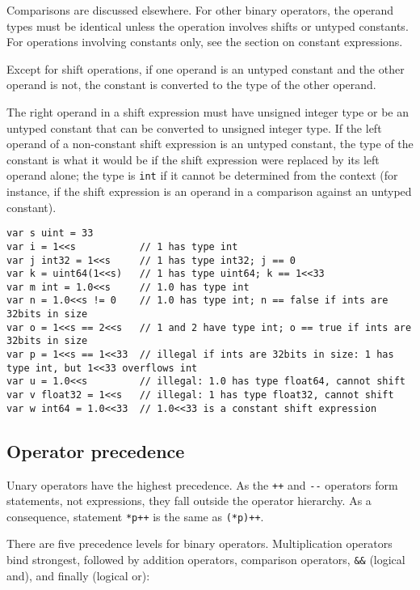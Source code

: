 Comparisons are discussed elsewhere.
For other binary operators, the operand types must be
identical unless the operation involves
shifts or untyped constants. For operations
involving constants only, see the section on
constant expressions.

Except for shift operations, if one operand is an untyped
constant and the other operand is not, the
constant is converted to the type of the other
operand.

The right operand in a shift expression must have unsigned integer type
or be an untyped constant that can be converted to unsigned integer
type. If the left operand of a non-constant shift expression is an
untyped constant, the type of the constant is what it would be if the
shift expression were replaced by its left operand alone; the type is
\texttt{int} if it cannot be determined from the context (for instance,
if the shift expression is an operand in a comparison against an untyped
constant).

\begin{Verbatim}[frame=single]
var s uint = 33
var i = 1<<s           // 1 has type int
var j int32 = 1<<s     // 1 has type int32; j == 0
var k = uint64(1<<s)   // 1 has type uint64; k == 1<<33
var m int = 1.0<<s     // 1.0 has type int
var n = 1.0<<s != 0    // 1.0 has type int; n == false if ints are 32bits in size
var o = 1<<s == 2<<s   // 1 and 2 have type int; o == true if ints are 32bits in size
var p = 1<<s == 1<<33  // illegal if ints are 32bits in size: 1 has type int, but 1<<33 overflows int
var u = 1.0<<s         // illegal: 1.0 has type float64, cannot shift
var v float32 = 1<<s   // illegal: 1 has type float32, cannot shift
var w int64 = 1.0<<33  // 1.0<<33 is a constant shift expression
\end{Verbatim}

\subsection*{Operator precedence}

Unary operators have the highest precedence. As the \texttt{++} and
\texttt{-{}-} operators form statements, not expressions, they fall
outside the operator hierarchy. As a consequence, statement
\texttt{*p++} is the same as \texttt{(*p)++}.

There are five precedence levels for binary operators. Multiplication
operators bind strongest, followed by addition operators, comparison
operators, \texttt{\&\&} (logical and), and finally
\texttt{\textbar{}\textbar{}} (logical or):

